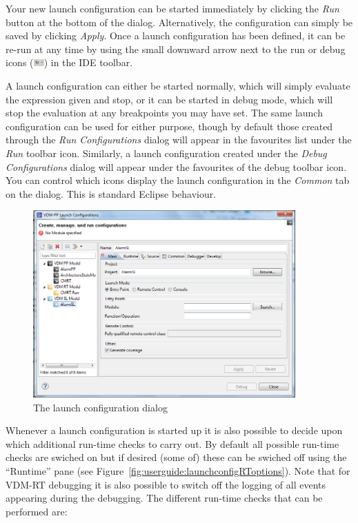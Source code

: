 \documentclass{overturerepchap}
\begin{document}
Your new launch configuration can be started immediately by clicking the \emph{Run}
button at the bottom of the dialog. Alternatively, the configuration can simply be
saved by clicking \emph{Apply}. Once a launch configuration has been defined, it
can be re-run at any time by using the small downward arrow next to the run or
debug icons (\includegraphics[width=0.03\textwidth]{icons/debuggericon})
in the IDE toolbar.

A launch configuration can either be started normally, which will simply evaluate
the expression given and stop, or it can be started in debug mode, which will
stop the evaluation at any breakpoints you may have set. The same launch configuration
can be used for either purpose, though by default those created through the
\emph{Run Configurations} dialog will appear in the favourites list under the
\emph{Run} toolbar icon. Similarly, a launch configuration created under the
\emph{Debug Configurations} dialog will appear under the favourites of the
debug toolbar icon. You can control which icons display the launch configuration
in the \emph{Common} tab on the dialog. This is standard Eclipse behaviour.


\begin{figure}[htp]
\begin{center}
  \includegraphics[width=380px]{screenDumps/launchconfig}
  \caption{The launch configuration dialog}
  \label{fig:userguide:launchconfig}
\end{center}
\end{figure}

Whenever a launch configuration is started up it is also possible to
decide upon which additional run-time checks to carry out. By default
all possible run-time checks are swiched on but if desired (some of)
these can be swiched off using the ``Runtime'' pane (see
Figure~\ref{fig:userguide:launchconfigRToptions}). Note that for
VDM-RT debugging it is also possible to switch off the logging of all
events appearing during the debugging. The different run-time checks
that can be performed are:
\end{document}
